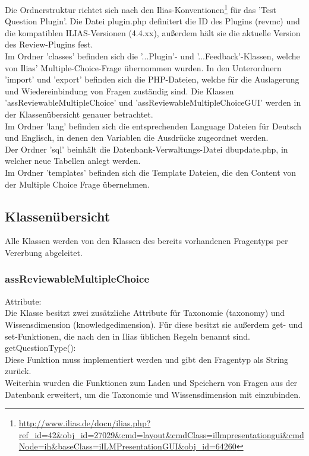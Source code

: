 \documentclass[a4paper]{scrreprt}
\begin{document}
Die Ordnerstruktur richtet sich nach den Ilias-Konventionen\footnote{\url{http://www.ilias.de/docu/ilias.php?ref_id=42&obj_id=27029&cmd=layout&cmdClass=illmpresentationgui&cmdNode=ih&baseClass=ilLMPresentationGUI&obj_id=64260}} für das 'Test Question Plugin'. 
Die Datei plugin.php definitert die ID des Plugins (revmc) und die kompatiblen ILIAS-Versionen (4.4.xx), außerdem hält sie die aktuelle Version des Review-Plugins fest.\\
Im Ordner 'classes' befinden sich die '...Plugin'- und '...Feedback'-Klassen, welche von Ilias' Multiple-Choice-Frage übernommen wurden. 
In den Unterordnern 'import' und 'export' befinden sich die PHP-Dateien, welche für die Auslagerung und Wiedereinbindung von Fragen zuständig sind. 
Die Klassen 'assReviewableMultipleChoice' und 'assReviewableMultipleChoiceGUI' werden in der Klassenübersicht genauer betrachtet.\\
Im Ordner 'lang' befinden sich die entsprechenden Language Dateien für Deutsch und Englisch, in denen den Variablen die Ausdrücke zugeordnet werden.\\
Der Ordner 'sql' beinhält die Datenbank-Verwaltungs-Datei dbupdate.php, in welcher neue Tabellen anlegt werden.\\
Im Ordner 'templates' befinden sich die Template Dateien, die den Content von der Multiple Choice Frage übernehmen.\\

\subsection{Klassenübersicht}

Alle Klassen werden von den Klassen des bereits vorhandenen Fragentyps per Vererbung abgeleitet.\\

\subsubsection{assReviewableMultipleChoice}

Attribute:\\
Die Klasse besitzt zwei zusätzliche Attribute für Taxonomie (taxonomy) und Wissensdimension (knowledge\textunderscore dimension).
Für diese besitzt sie außerdem get- und set-Funktionen, die nach den in Ilias üblichen Regeln benannt sind.\\

getQuestionType():\\
Diese Funktion muss implementiert werden und gibt den Fragentyp als String zurück.\\
Weiterhin wurden die Funktionen zum Laden und Speichern von Fragen aus der Datenbank erweitert, um die Taxonomie und Wissensdimension mit einzubinden.\\
\end{document}
